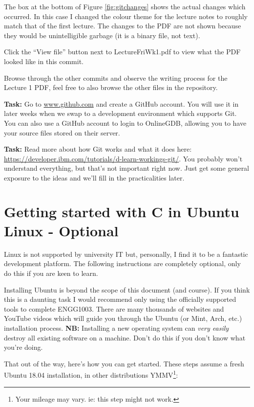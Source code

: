 \documentclass{lab}
\begin{document}
The box at the bottom of Figure \ref{fig:gitchanges} shows the actual changes which occurred. In this case I changed the colour theme for the lecture notes to roughly match that of the first lecture. The changes to the PDF are not shown because they would be unintelligible garbage (it is a binary file, not text).

Click the ``View file'' button next to LectureFriWk1.pdf to view what the PDF looked like in this commit.

Browse through the other commits and observe the writing process for the Lecture 1 PDF, feel free to also browse the other files in the repository.

\textbf{Task:} Go to \url{www.github.com} and create a GitHub account. You will use it in later weeks when we swap to a development environment which supports Git. You can also use a GitHub account to login to OnlineGDB, allowing you to have your source files stored on their server.

\textbf{Task:} Read more about how Git works and what it does here: \url{https://developer.ibm.com/tutorials/d-learn-workings-git/}. You probably won't understand everything, but that's not important right now. Just get some general exposure to the ideas and we'll fill in the practicalities later.

\pagebreak
\section{Getting started with C in Ubuntu Linux - Optional}

Linux is not supported by university IT but, personally, I find it to be a fantastic development platform. The following instructions are completely optional, only do this if you are keen to learn.

Installing Ubuntu is beyond the scope of this document (and course). If you think this is a daunting task I would recommend only using the officially supported tools to complete ENGG1003. There are many thousands of websites and YouTube videos which will guide you through the Ubuntu (or Mint, Arch, etc.) installation process. \textbf{NB:} Installing a new operating system can \textit{very easily} destroy all existing software on a machine. Don't do this if you don't know what you're doing.

That out of the way, here's how you can get started. These steps assume a fresh Ubuntu 18.04 installation, in other distributions YMMV\footnote{Your mileage may vary. ie: this step might not work.}:
\end{document}
